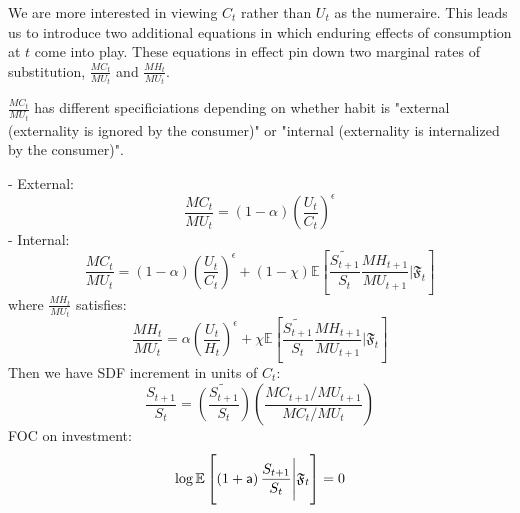 \documentclass{article}
\theoremstyle{exampstyle}
\begin{document}
We are more interested in viewing $C_t$ rather than $U_t$ as the numeraire. This leads us to introduce two additional equations in which enduring effects of consumption at $t$ come into play. These equations in effect pin down two marginal rates of substitution, $\frac{MC_t}{MU_t}$ and $\frac{MH_t}{MU_t}$. 

$\frac{MC_t}{MU_t}$ has different specificiations depending on whether habit is "external (externality is ignored by the consumer)" or "internal (externality is internalized by the consumer)".

- External:
\begin{equation}\label{key}
	\frac{MC_t}{MU_t} = (1-\alpha)\left( \frac{U_t}{C_t} \right)^\epsilon
\end{equation}
- Internal:
\begin{equation}\label{key}
	  \frac{MC_t}{MU_t} = (1-\alpha)\left( \frac{U_t}{C_t} \right)^\epsilon + (1-\chi) \mathbb{E}\left[\widetilde{\frac{S_{t+1}}{S_t}}\frac{MH_{t+1}}{MU_{t+1}} \Biggl| {\mathfrak F}_t\right]
\end{equation}
where $\frac{MH_t}{MU_t}$ satisfies:
\begin{equation}\label{key}
	   \frac{MH_t}{MU_t} = \alpha\left( \frac{U_t}{H_t} \right)^\epsilon + \chi \mathbb{E}\left[\widetilde{\frac{S_{t+1}}{S_t}}\frac{MH_{t+1}}{MU_{t+1}} \Biggl| {\mathfrak F}_t \right]
\end{equation}
Then we have SDF increment in units of $C_t$:
\begin{equation}\label{key}
	 \frac{S_{t+1}}{S_t} = \widetilde{\left(\frac{S_{t+1}}{S_t}\right)}\left(\frac{{MC_{t+1}}/{MU_{t+1}}}{{MC_t}/{MU_t}}\right)
\end{equation}
FOC on investment:
\begin{equation}\label{key}
 \log\mathbb{E}\left[\left(1+ {\sf a}\right)\frac{S_{t+1}}{S_t}\Biggl| {\mathfrak F}_t\right] = 0 
\end{equation}
\end{document}
